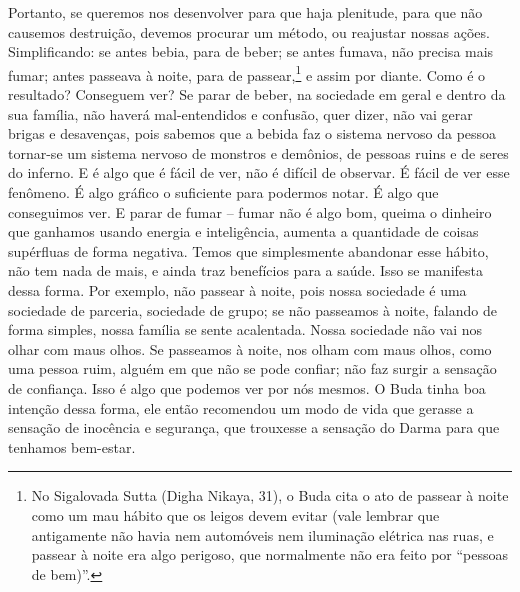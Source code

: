 Portanto, se queremos nos desenvolver
para que haja plenitude, para que não causemos destruição, devemos
procurar um método, ou reajustar nossas ações. Simplificando: se antes
bebia, para de beber; se antes fumava, não precisa mais fumar; antes
passeava à noite, para de passear,\footnote{No Sigalovada Sutta (Digha
Nikaya, 31), o Buda cita o ato de passear à noite como um mau hábito
que os leigos devem evitar (vale lembrar que antigamente não havia nem
automóveis nem iluminação elétrica nas ruas, e passear à noite era algo
perigoso, que normalmente não era feito por “pessoas de bem)”.} e
assim por diante. Como é o resultado? Conseguem ver? Se parar de beber,
na sociedade em geral e dentro da sua família, não haverá
mal-entendidos e confusão, quer dizer, não vai gerar brigas e
desavenças, pois sabemos que a bebida faz o sistema nervoso da pessoa
tornar-se um sistema nervoso de monstros e demônios, de pessoas ruins e
de seres do inferno. E é algo que é fácil de ver, não é difícil de
observar. É fácil de ver esse fenômeno. É algo
gráfico o suficiente para podermos notar. É
algo que conseguimos ver. E parar de fumar – fumar não é algo bom,
queima o dinheiro que ganhamos usando energia e inteligência, aumenta a
quantidade de coisas supérfluas de forma negativa. Temos que
simplesmente abandonar esse hábito, não tem nada de
mais, e ainda traz benefícios para a saúde.
Isso se manifesta dessa forma. Por exemplo, não passear à noite, pois
nossa sociedade é uma sociedade de parceria, sociedade de grupo; se não
passeamos à noite, falando de forma simples, nossa família se sente
acalentada. Nossa sociedade não vai nos olhar com maus olhos. Se
passeamos à noite, nos olham com maus olhos, como uma pessoa ruim,
alguém em que não se pode confiar; não faz surgir a sensação de
confiança. Isso é algo que podemos ver por
nós mesmos. O Buda tinha boa intenção dessa
forma, ele então recomendou um modo de vida que gerasse a sensação de
inocência e segurança, que trouxesse a sensação do Darma para que
tenhamos bem-estar. 


